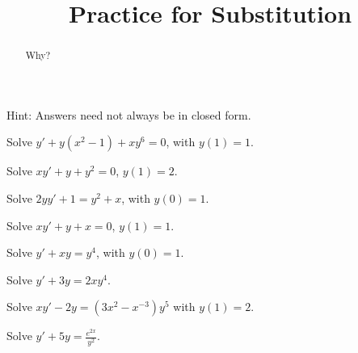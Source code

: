 \documentclass{ximera}
\title{Practice for Substitution}
\begin{document}
\begin{abstract}
    Why?
\end{abstract}
\maketitle

Hint: Answers need not always be in closed form.

\begin{exercise}
    Solve $y'+ y(x^2-1)+xy^6 = 0$, with $y(1)=1$.
\end{exercise}

\begin{exercise}%
    Solve $xy'+y+y^2 = 0$, $y(1)=2$.
\end{exercise}

\begin{exercise}
    Solve $2yy' + 1 = y^2 + x$, with $y(0)=1$.
\end{exercise}

\begin{exercise}%
    Solve $xy'+y +x = 0$, $y(1)=1$.
\end{exercise}

\begin{exercise}
    Solve $y' + xy = y^4$, with $y(0)=1$.
\end{exercise}

\begin{exercise}
    Solve $y' + 3y = 2xy^4$.
\end{exercise}

\begin{exercise}
    Solve $xy' - 2y = (3x^2 - x^{-3})y^5$ with $y(1) = 2$. 
\end{exercise}

\begin{exercise}
    Solve $y' + 5y = \frac{e^{2x}}{y^2}$.
\end{exercise}
\end{document}
